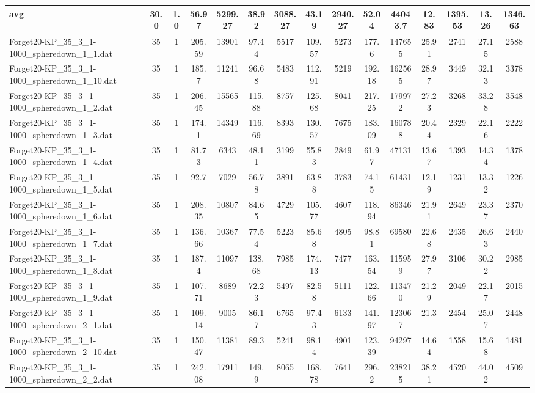 \begin{table}[!ht]
{\begin{tabular}{lcccccccccccccc}
\hline avg & 30.0 & 1.0 & 56.97& 5299.27 & 38.92& 3088.27 & 43.19& 2940.27 & 52.04& 44043.7 & 12.83& 1395.53 & 13.26& 1346.63\\ \hline
Forget20-KP\_35\_3\_1-1000\_spheredown\_1\_1.dat & 35 & 1 & 205.59 & 13901 & 97.44 & 5517 & 109.57 & 5273 & 177.6 & 147655 & 25.91 & 2741 & 27.15 & 2588 \\
Forget20-KP\_35\_3\_1-1000\_spheredown\_1\_10.dat & 35 & 1 & 185.7 & 11241 & 96.68 & 5483 & 112.91 & 5219 & 192.18 & 162565 & 28.97 & 3449 & 32.13 & 3378 \\
Forget20-KP\_35\_3\_1-1000\_spheredown\_1\_2.dat & 35 & 1 & 206.45 & 15565 & 115.88 & 8757 & 125.68 & 8041 & 217.25 & 179972 & 27.23 & 3268 & 33.28 & 3548 \\
Forget20-KP\_35\_3\_1-1000\_spheredown\_1\_3.dat & 35 & 1 & 174.1 & 14349 & 116.69 & 8393 & 130.57 & 7675 & 183.09 & 160788 & 20.44 & 2329 & 22.16 & 2222 \\
Forget20-KP\_35\_3\_1-1000\_spheredown\_1\_4.dat & 35 & 1 & 81.73 & 6343 & 48.11 & 3199 & 55.83 & 2849 & 61.97 & 47131 & 13.67 & 1393 & 14.34 & 1378 \\
Forget20-KP\_35\_3\_1-1000\_spheredown\_1\_5.dat & 35 & 1 & 92.7 & 7029 & 56.78 & 3891 & 63.88 & 3783 & 74.15 & 61431 & 12.19 & 1231 & 13.32 & 1226 \\
Forget20-KP\_35\_3\_1-1000\_spheredown\_1\_6.dat & 35 & 1 & 208.35 & 10807 & 84.65 & 4729 & 105.77 & 4607 & 118.94 & 86346 & 21.91 & 2649 & 23.37 & 2370 \\
Forget20-KP\_35\_3\_1-1000\_spheredown\_1\_7.dat & 35 & 1 & 136.66 & 10367 & 77.54 & 5223 & 85.68 & 4805 & 98.81 & 69580 & 22.68 & 2435 & 26.63 & 2440 \\
Forget20-KP\_35\_3\_1-1000\_spheredown\_1\_8.dat & 35 & 1 & 187.4 & 11097 & 138.68 & 7985 & 174.13 & 7477 & 163.54 & 115959 & 27.97 & 3106 & 30.22 & 2985 \\
Forget20-KP\_35\_3\_1-1000\_spheredown\_1\_9.dat & 35 & 1 & 107.71 & 8689 & 72.23 & 5497 & 82.58 & 5111 & 122.66 & 113470 & 21.29 & 2049 & 22.17 & 2015 \\
Forget20-KP\_35\_3\_1-1000\_spheredown\_2\_1.dat & 35 & 1 & 109.14 & 9005 & 86.17 & 6765 & 97.43 & 6133 & 141.97 & 123067 & 21.3 & 2454 & 25.07 & 2448 \\
Forget20-KP\_35\_3\_1-1000\_spheredown\_2\_10.dat & 35 & 1 & 150.47 & 11381 & 89.3 & 5241 & 98.14 & 4901 & 123.39 & 94297 & 14.64 & 1558 & 15.68 & 1481 \\
Forget20-KP\_35\_3\_1-1000\_spheredown\_2\_2.dat & 35 & 1 & 242.08 & 17911 & 149.9 & 8065 & 168.78 & 7641 & 296.2 & 238215 & 38.21 & 4520 & 44.02 & 4509 \\

\end{tabular}}
\end{table}

